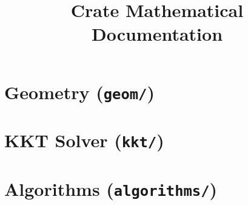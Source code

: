 \documentclass{article}
\title{Crate Mathematical Documentation}
\author{}
\date{}
\begin{document}
\maketitle
\tableofcontents
\newpage

\section{Geometry (\texttt{geom/})}


\section{KKT Solver (\texttt{kkt/})}


\section{Algorithms (\texttt{algorithms/})}


\printbibliography
\end{document}
